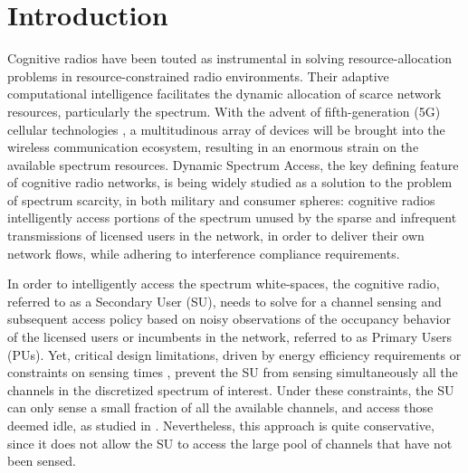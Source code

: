 \documentclass[12pt, draftcls, onecolumn]{IEEEtran}
\begin{document}
\section{Introduction}\label{O}
Cognitive radios have been touted as instrumental in solving resource-allocation problems in resource-constrained radio environments. Their adaptive computational intelligence facilitates the dynamic allocation of scarce network resources, particularly the spectrum. With the advent of fifth-generation (5G) cellular technologies \cite{Ericsson:5Gusecases, WSJ:5Gdominance}, a multitudinous array of devices will be brought into the wireless communication ecosystem, resulting in an enormous strain on the available spectrum resources. Dynamic Spectrum Access, the key defining feature of cognitive radio networks, is being widely studied as a solution to the problem of spectrum scarcity, in both military and consumer spheres: cognitive radios intelligently access portions of the spectrum unused by the sparse and infrequent transmissions of licensed users in the network, in order to deliver their own network flows, while adhering to
interference compliance requirements.

In order to intelligently access the spectrum white-spaces, the
cognitive radio, referred to as a Secondary User (SU), needs to solve for a channel sensing and subsequent access policy based on noisy observations of the occupancy behavior of the licensed users or incumbents in the network, referred to as Primary Users (PUs). Yet, critical design limitations, driven by energy efficiency requirements or constraints on sensing times \cite{WCL:3}, prevent the SU from sensing simultaneously all the channels in the discretized spectrum of interest. Under these constraints, the SU can only sense a small fraction of all the available channels, and access those deemed idle, as studied in \cite{WCL:3, WCL:4, WCL:5, WCL:6, WCL:8, WCL:9, WCL:10, WCL:11}. Nevertheless, this approach is quite conservative, since it does not allow the SU to access the large pool of channels that have not been sensed.
\end{document}

